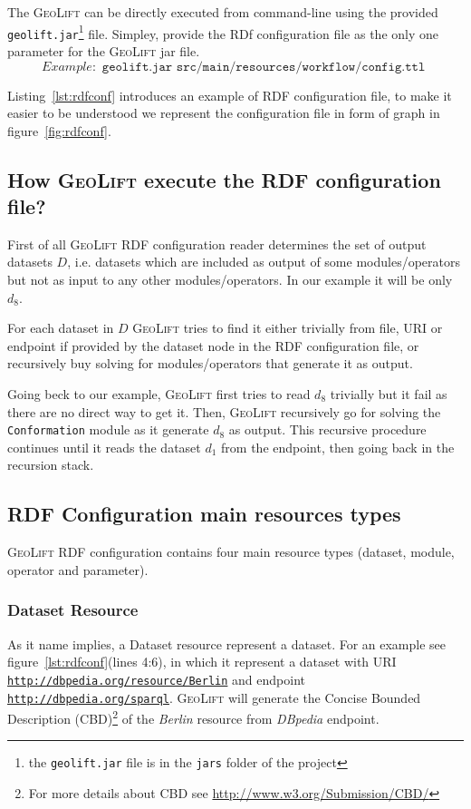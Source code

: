 \documentclass[a4paper,twoside,bibtotoc,abstracton,12pt,BCOR=15mm]{article}
\newcommand{\geolift}{\textsc{GeoLift}\xspace}
\begin{document}
The \geolift can be directly executed from command-line using the provided \texttt{geolift.jar}\footnote{the \texttt{geolift.jar} file is in the \texttt{jars} folder of the project} file.
Simpley, provide the RDf configuration file as the only one parameter for the \geolift jar file.
\begin{equation*}
  Example: \texttt{ geolift.jar src/main/resources/workflow/config.ttl }
\end{equation*}



Listing~\ref{lst:rdfconf} introduces an example of RDF configuration file, to make it easier to be understood we represent the configuration file in form of graph in figure~\ref{fig:rdfconf}.

\subsection{How \geolift execute the RDF configuration file?}
First of all \geolift RDF configuration reader determines the set of output datasets $D$, 
i.e. datasets which are included as output of some modules/operators but not as input to any other modules/operators.
In our example it will be only $d_8$.

For each dataset in $D$ \geolift tries to find it either trivially from file, URI or endpoint if provided by the dataset node in the RDF configuration file, 
or recursively buy solving for modules/operators that generate it as output.

Going beck to our example, \geolift first tries to read $d_8$ trivially but it fail as there are no direct way to get it. 
Then, \geolift recursively go for solving the \texttt{Conformation} module as it generate $d_8$ as output. 
This recursive procedure continues until it reads the dataset $d_1$ from the endpoint, then going back in the recursion stack.

\subsection{RDF Configuration main resources types}
\geolift RDF configuration contains four main resource types (dataset, module, operator and parameter).

\subsubsection{Dataset Resource}
    As it name implies, a Dataset resource represent a dataset. 
    For an example see figure~\ref{lst:rdfconf}(lines 4:6), in which it represent a dataset with URI \texttt{\url{http://dbpedia.org/resource/Berlin}} and endpoint \texttt{\url{http://dbpedia.org/sparql}}.
    \geolift will generate the Concise Bounded Description (CBD)\footnote{For more details about CBD see \url{http://www.w3.org/Submission/CBD/}} of the \emph{Berlin} resource from \emph{DBpedia} endpoint. 
\end{document}
